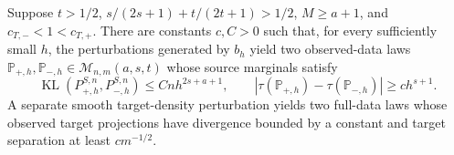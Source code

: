 Suppose \(t>1/2\), \(s/(2s+1)+t/(2t+1)>1/2\), \(M\ge a+1\), and \(c_{T,-}<1<c_{T,+}\). There are constants \(c,C>0\) such that, for every sufficiently small \(h\), the perturbations generated by \(b_h\) yield two observed-data laws \(\mathbb P_{+,h},\mathbb P_{-,h}\in\mathcal M_{n,m}(a,s,t)\) whose source marginals satisfy \[\operatorname{KL}(P_{+,h}^{S,n},P_{-,h}^{S,n})\le Cnh^{2s+a+1},\qquad |\tau(\mathbb P_{+,h})-\tau(\mathbb P_{-,h})|\ge ch^{s+1}.\] A separate smooth target-density perturbation yields two full-data laws whose observed target projections have divergence bounded by a constant and target separation at least \(cm^{-1/2}\).